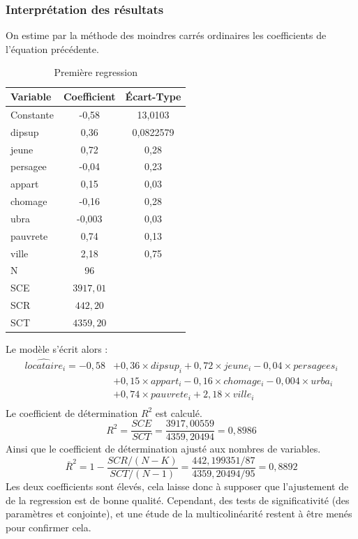 \documentclass[12pt]{article}
\begin{document}
\subsubsection{Interprétation des résultats }
On estime par la méthode des moindres carrés ordinaires les coefficients de l'équation précédente.
\begin{table}[H]
\centering
\caption{Première regression}
\begin{tabular}{l*{1}{|cc}}
\toprule
Variable            & Coefficient         &  Écart-Type\\
\midrule
Constante &  -0,58 &  13,0103\\
dipsup	& 0,36	& 0,0822579\\
jeune  & 0,72 & 0,28\\
persagee&  -0,04 & 0,23\\
appart& 0,15 & 0,03\\
chomage& -0,16 & 0,28\\
ubra& -0,003 & 0,03\\
pauvrete& 0,74& 0,13\\
ville &   2,18  &  0,75\\
\midrule
N&          96         &            \\
SCE & $3917,01$ \\
SCR & $442,20$ \\
SCT & $4359,20$ \\
\bottomrule
\end{tabular}
\end{table}
Le modèle s'écrit alors : 
\begin{equation*}
    \begin{split}
			\hat{locataire}_i =  -0,58 &+ 0,36 \times dipsup_i + 0,72 \times jeune_i - 0,04 \times persagees_i \\
            &+ 0,15 \times appart_i -0,16 \times chomage_i - 0,004 \times urba_i \\ 
			& + 0,74 \times pauvrete_i + 2,18 \times ville_i \\
    \end{split}
\end{equation*}
Le coefficient de détermination $R^{2}$ est calculé.
\begin{equation*}
    R^{2} = \frac{SCE}{SCT} = \frac{3917,00559}{4359,20494} = 0,8986
\end{equation*}
Ainsi que le coefficient de détermination ajusté aux nombres de variables.
\begin{equation*}
    \bar{R}^{2} = 1 - \frac{SCR/(N-K)}{SCT/(N-1)} = \frac{442,199351/87}{4359,20494/95} = 0,8892
\end{equation*}
Les deux coefficients sont élevés, cela laisse donc à supposer que l'ajustement de de la regression est de bonne qualité. Cependant, des tests de 
significativité (des paramètres et conjointe), et une étude de la multicolinéarité restent à être menés pour confirmer cela.
\end{document}

